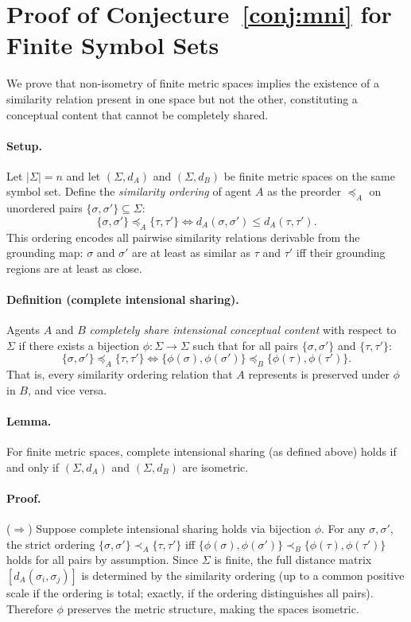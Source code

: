 \documentclass[12pt]{article}
\begin{document}
\section{Proof of Conjecture~\ref{conj:mni} for Finite Symbol Sets}
\label{app:proof}

We prove that non-isometry of finite metric spaces implies the
existence of a similarity relation present in one space but not the other,
constituting a conceptual content that cannot be completely shared.

\paragraph{Setup.}
Let $|\Sigma| = n$ and let $(\Sigma, d_A)$ and $(\Sigma, d_B)$
be finite metric spaces on the same symbol set.
Define the \emph{similarity ordering} of agent $A$ as the preorder
$\preceq_A$ on unordered pairs $\{{\sigma, \sigma'}\} \subseteq \Sigma$:
\[
\{\sigma, \sigma'\} \preceq_A \{\tau, \tau'\}
\iff d_A(\sigma, \sigma') \leq d_A(\tau, \tau').
\]
This ordering encodes all pairwise similarity relations derivable
from the grounding map: $\sigma$ and $\sigma'$ are at least as similar
as $\tau$ and $\tau'$ iff their grounding regions are at least as close.

\paragraph{Definition (complete intensional sharing).}
Agents $A$ and $B$ \emph{completely share intensional conceptual content}
with respect to $\Sigma$ if there exists a bijection $\phi: \Sigma \to \Sigma$
such that for all pairs $\{\sigma, \sigma'\}$ and $\{\tau, \tau'\}$:
\[
\{\sigma, \sigma'\} \preceq_A \{\tau, \tau'\}
\iff \{\phi(\sigma), \phi(\sigma')\} \preceq_B \{\phi(\tau), \phi(\tau')\}.
\]
That is, every similarity ordering relation that $A$ represents
is preserved under $\phi$ in $B$, and vice versa.

\paragraph{Lemma.}
For finite metric spaces, complete intensional sharing (as defined above)
holds if and only if $(\Sigma, d_A)$ and $(\Sigma, d_B)$ are isometric.

\paragraph{Proof.}
($\Rightarrow$) Suppose complete intensional sharing holds via bijection $\phi$.
For any $\sigma, \sigma'$, the strict ordering
$\{\sigma, \sigma'\} \prec_A \{\tau, \tau'\}$ iff
$\{\phi(\sigma), \phi(\sigma')\} \prec_B \{\phi(\tau), \phi(\tau')\}$
holds for all pairs by assumption.
Since $\Sigma$ is finite, the full distance matrix $[d_A(\sigma_i, \sigma_j)]$
is determined by the similarity ordering (up to a common positive scale
if the ordering is total; exactly, if the ordering distinguishes all pairs).
Therefore $\phi$ preserves the metric structure, making the spaces isometric.
\end{document}

